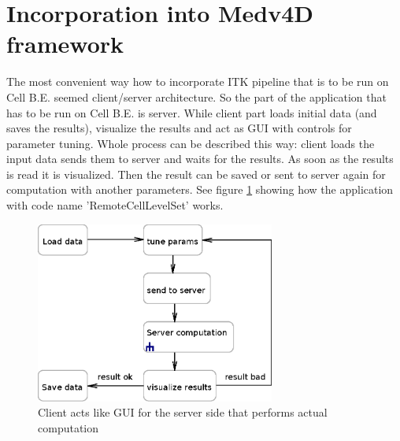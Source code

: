 \section{Incorporation into Medv4D framework}

\par
The most convenient way how to incorporate ITK pipeline that is to be run on Cell B.E. seemed client/server architecture.
So the part of the application that has to be run on Cell B.E. is server.
While client part loads initial data (and saves the results), visualize the results and act as GUI with controls for parameter tuning.
Whole process can be described this way: client loads the input data sends them to server and waits for the results.
As soon as the results is read it is visualized.
Then the result can be saved or sent to server again for computation with another parameters.
See figure \ref{fg:computationProcess} showing how the application with code name 'RemoteCellLevelSet' works.

\begin{figure}
    \centering
    \includegraphics[width=0.7\textwidth]{data/computationProcess}
    \caption[RemoteCellLevelSet application computation process]{Client acts like GUI for the server side that performs actual computation}
    \label{fg:computationProcess}
\end{figure}


